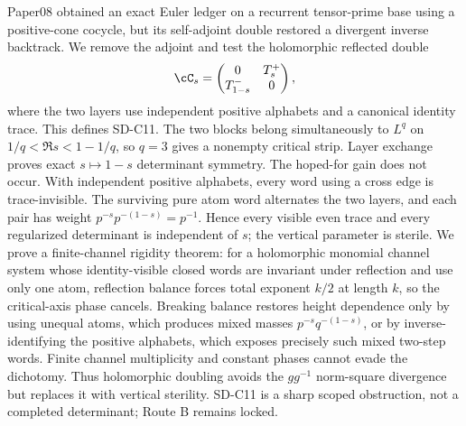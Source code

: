 Paper08 obtained an exact Euler ledger on a recurrent tensor-prime base using
a positive-cone cocycle, but its self-adjoint double restored a divergent
inverse backtrack.  We remove the adjoint and test the holomorphic reflected
double
\[
 \cC_s=\begin{pmatrix}0&T_s^+\\T_{1-s}^-&0\end{pmatrix},
\]
where the two layers use independent positive alphabets and a canonical
identity trace.  This defines SD-C11.  The two blocks belong simultaneously
to $L^q$ on $1/q<\Re s<1-1/q$, so $q=3$ gives a nonempty critical strip.
Layer exchange proves exact $s\mapsto1-s$ determinant symmetry.  The hoped-for
gain does not occur.  With independent positive alphabets, every word using a
cross edge is trace-invisible.  The surviving pure atom word alternates the
two layers, and each pair has weight
$p^{-s}p^{-(1-s)}=p^{-1}$.  Hence every visible even trace and every
regularized determinant is independent of $s$; the vertical parameter is
sterile.  We prove a finite-channel rigidity theorem: for a holomorphic
monomial channel system whose identity-visible closed words are invariant
under reflection and use only one atom, reflection balance forces total
exponent $k/2$ at length $k$, so the critical-axis phase cancels.  Breaking
balance restores height dependence only by using unequal atoms, which
produces mixed masses $p^{-s}q^{-(1-s)}$, or by inverse-identifying the
positive alphabets, which exposes precisely such mixed two-step words.
Finite channel multiplicity and constant phases cannot evade the dichotomy.
Thus holomorphic doubling avoids the $gg^{-1}$ norm-square divergence but
replaces it with vertical sterility.  SD-C11 is a sharp scoped obstruction,
not a completed determinant; Route B remains locked.

